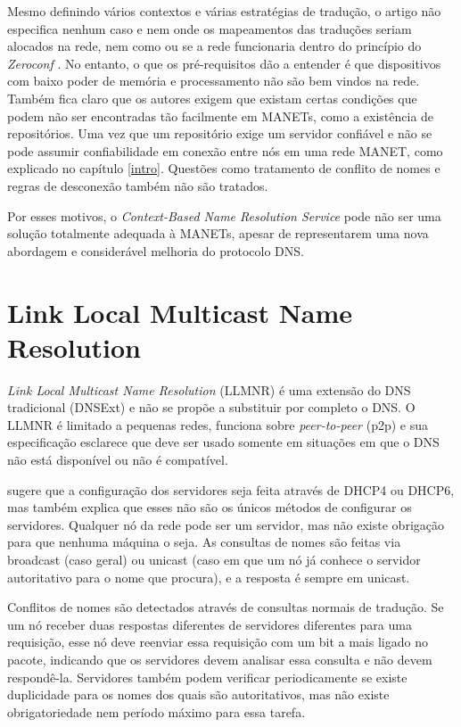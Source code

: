     Mesmo definindo vários contextos e várias estratégias de tradução, o artigo
    não especifica nenhum caso e nem onde os mapeamentos das traduções seriam
    alocados na rede, nem como ou se a rede funcionaria dentro do princípio do
    \textit{Zeroconf} \cite{zeroconf}. No entanto, o que os pré-requisitos dão
    a entender é que dispositivos com baixo poder de memória e processamento
    não são bem vindos na rede. Também fica claro que os autores exigem que
    existam certas condições que podem não ser encontradas tão facilmente em
    MANETs, como a existência de repositórios. Uma vez que um repositório exige
    um servidor confiável e não se pode assumir confiabilidade em conexão entre
    nós em uma rede MANET, como explicado no capítulo \ref{intro}. Questões como
    tratamento de conflito de nomes e regras de desconexão também não são tratados.
    
    Por esses motivos, o \textit{Context-Based Name Resolution Service} pode não
    ser uma solução totalmente adequada à MANETs, apesar de representarem
    uma nova abordagem e considerável melhoria do protocolo DNS.

\section{Link Local Multicast Name Resolution}

    \textit{Link Local Multicast Name Resolution} (LLMNR) \cite{llmnr} é uma
    extensão do DNS tradicional (DNSExt) e não se propõe a substituir por
    completo o DNS. O LLMNR é limitado a pequenas redes, funciona sobre
    \textit{peer-to-peer} (p2p) e sua especificação esclarece que deve ser usado
    somente em situações em que o DNS não está disponível ou não é compatível.
    
    \cite{llmnr} sugere que a configuração dos servidores seja feita através de
    DHCP4 ou DHCP6, mas também explica que esses não são os únicos métodos de
    configurar os servidores. Qualquer nó da rede pode ser um servidor, mas não
    existe obrigação para que nenhuma máquina o seja. As consultas de nomes são
    feitas via broadcast (caso geral) ou unicast (caso em que um nó já conhece o
    servidor autoritativo para o nome que procura), e a resposta é sempre em unicast.
    
    Conflitos de nomes são detectados através de consultas normais de tradução. Se
    um nó receber duas respostas diferentes de servidores diferentes para uma
    requisição, esse nó deve reenviar essa requisição com um bit a mais ligado
    no pacote, indicando que os servidores devem analisar essa consulta e não
    devem respondê-la. Servidores também podem verificar periodicamente se existe
    duplicidade para os nomes dos quais são autoritativos, mas não existe
    obrigatoriedade nem período máximo para essa tarefa.
    
